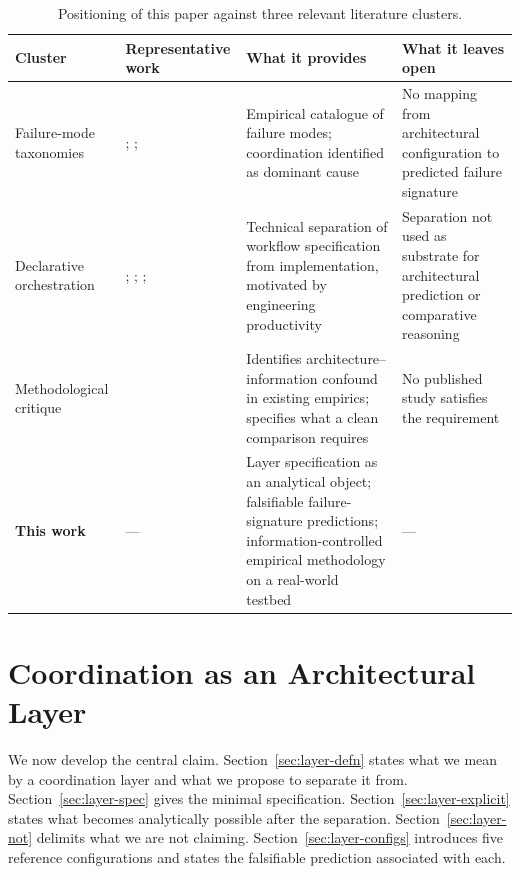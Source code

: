 \documentclass[11pt]{article}
\begin{document}
\begin{table}[h]
\centering
\small
\begin{tabularx}{\textwidth}{@{}lXXX@{}}
\toprule
\textbf{Cluster} & \textbf{Representative work} & \textbf{What it provides} & \textbf{What it leaves open} \\
\midrule
Failure-mode taxonomies &
\citet{cemri2025mast}; \citet{sid2026}; \citet{wynn2025talk} &
Empirical catalogue of failure modes; coordination identified as dominant cause &
No mapping from architectural configuration to predicted failure signature \\
\addlinespace
Declarative orchestration &
\citet{daunis2025declarative}; \citet{auton2026}; \citet{strands2025}; \citet{foundry2026} &
Technical separation of workflow specification from implementation, motivated by engineering productivity &
Separation not used as substrate for architectural prediction or comparative reasoning \\
\addlinespace
Methodological critique &
\citet{reliability2026} &
Identifies architecture--information confound in existing empirics; specifies what a clean comparison requires &
No published study satisfies the requirement \\
\midrule
\textbf{This work} & --- &
Layer specification as an analytical object; falsifiable failure-signature predictions; information-controlled empirical methodology on a real-world testbed &
--- \\
\bottomrule
\end{tabularx}
\caption{Positioning of this paper against three relevant literature clusters.}
\label{tab:positioning}
\end{table}

\section{Coordination as an Architectural Layer}
\label{sec:layer}

We now develop the central claim. Section~\ref{sec:layer-defn} states what we mean by a coordination layer and what we propose to separate it from. Section~\ref{sec:layer-spec} gives the minimal specification. Section~\ref{sec:layer-explicit} states what becomes analytically possible after the separation. Section~\ref{sec:layer-not} delimits what we are not claiming. Section~\ref{sec:layer-configs} introduces five reference configurations and states the falsifiable prediction associated with each.
\end{document}
